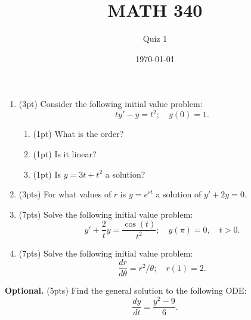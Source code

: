 \documentclass{article}
\begin{document}
\title{MATH 340}
\author{Quiz 1}
\date{\today}
\maketitle

\begin{enumerate}
	\item (3pt) Consider the following initial value problem:
	\[ty'-y=t^2;\quad y(0)=1.\]
\begin{enumerate}
	\item (1pt) What is the order?
	\item (1pt) Is it linear?
	\item (1pt) Is $y=3t+t^2$ a solution?
\end{enumerate}
\vspace{2cm}
\item (3pts) For what values of $r$ is $y=e^{rt}$ a solution of $y'+2y=0$.
\vspace{3cm}
\item (7pts) Solve the following initial value problem:
	\[y'+\frac{2}{t}y=\frac{\cos(t)}{t^2};\quad y(\pi)=0,\quad t>0.\]
\newpage
\vspace{4cm}
\item (7pts) Solve the following initial value problem:
	\[\frac{dr}{d\theta}=r^2/\theta;\quad r(1)=2.\]
\end{enumerate}
\vspace{12cm}
\textbf{Optional.} (5pts) Find the general solution to the following ODE:
	\[\frac{dy}{dt}=\frac{y^2-9}{6}.\]
\end{document}
